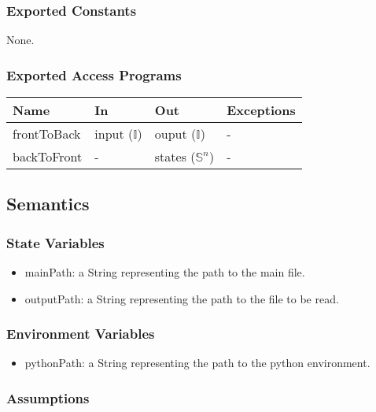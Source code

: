 \documentclass[12pt, titlepage]{article}
\begin{document}
\subsubsection{Exported Constants}
None.

\subsubsection{Exported Access Programs}

\begin{center}
\begin{tabular}{p{2cm} p{4cm} p{4cm} p{2cm}}
\hline
\textbf{Name} & \textbf{In} & \textbf{Out} & \textbf{Exceptions} \\
\hline
frontToBack & input ($\mathbb{I}$) & ouput ($\mathbb{I}$) & - \\
backToFront & - & states ($\mathbb{S}^n$) & - \\
\hline
\end{tabular}
\end{center}

\subsection{Semantics}

\subsubsection{State Variables}

\begin{itemize}
  \item mainPath: a String representing the path to the main file.
  \item outputPath: a String representing the path to the file to be read.
\end{itemize}

\subsubsection{Environment Variables}

\begin{itemize}
  \item pythonPath: a String representing the path to the python environment.
\end{itemize}

\subsubsection{Assumptions}
\end{document}
